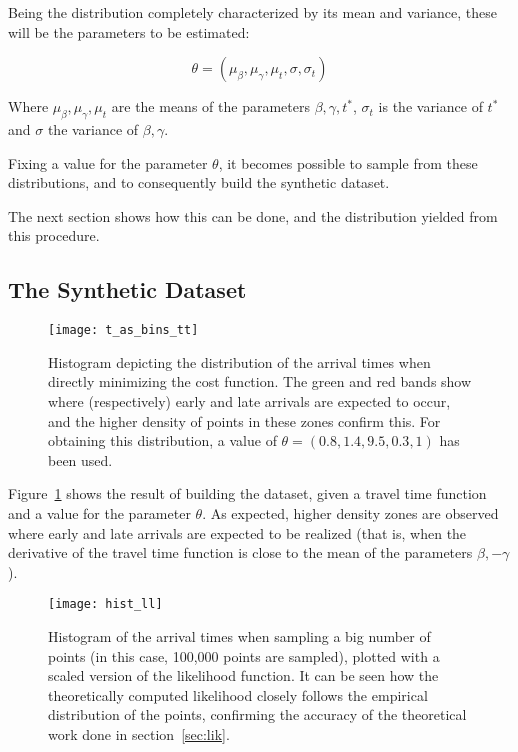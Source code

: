 Being the distribution completely characterized by its mean and variance,
these will be the parameters to be estimated:

\begin{equation}
  \label{eq:theta_def}
  \theta = (\mu_\beta, \mu_\gamma, \mu_t, \sigma, \sigma_t)
\end{equation}

Where \(\mu_\beta, \mu_\gamma, \mu_t\) are the means of the parameters \(\beta, \gamma, t^*\),
\(\sigma_t\) is the variance of \(t^*\) and \(\sigma\) the variance of \(\beta, \gamma\).

Fixing a value for the parameter \(\theta\),
it becomes possible to sample from these distributions,
and to consequently build the synthetic dataset.

The next section shows how this can be done, and the distribution yielded from this procedure.

\subsection{The Synthetic Dataset}


\begin{figure}
  \centering
  \texttt{[image: t\_as\_bins\_tt]}
  \caption{Histogram depicting the distribution of the arrival times when directly minimizing the cost function.
    The green and red bands show where (respectively) early and late arrivals are expected to occur,
    and the higher density of points in these zones confirm this.
  For obtaining this distribution, a value of \(\theta = (0.8, 1.4, 9.5, 0.3, 1)\) has been used.}
  \label{fig:t_as}
\end{figure}

Figure~\ref{fig:t_as} shows the result of building the dataset, given a travel time function and a value for the parameter \(\theta\).
As expected, higher density zones are observed where early and late arrivals are expected to be realized
(that is, when the derivative of the travel time function is close to the mean of the parameters \(\beta, -\gamma\)).

\begin{figure}
  \centering
  \texttt{[image: hist\_ll]}
  \caption{Histogram of the arrival times when sampling a big number of points (in this case, 100,000 points are sampled),
    plotted with a scaled version of the likelihood function.
    It can be seen how the theoretically computed likelihood closely follows the empirical distribution of the points,
    confirming the accuracy of the theoretical work done in section~\ref{sec:lik}.}
  \label{fig:hist_pdf}
\end{figure}

